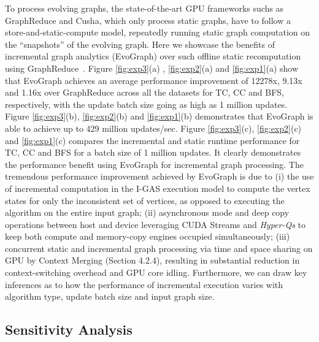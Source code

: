 To process evolving graphs, the state-of-the-art GPU frameworks suchs as GraphReduce and Cusha, which only process static graphs, have to follow a store-and-static-compute model, repeatedly running static graph computation on the “snapshots” of the evolving graph. Here we showcase the benefits of incremental graph analytics (EvoGraph) over such offline static recomputation using GraphReduce~\cite{GraphReduce}. Figure \ref{fig:exp3}(a) , \ref{fig:exp2}(a) and  \ref{fig:exp1}(a) show that  EvoGraph achieves an average performance improvement of 12278x, 9.13x and 1.16x over GraphReduce across all the datasets for TC, CC and BFS, respectively, with the update batch size going as high as 1 million updates. Figure  \ref{fig:exp3}(b), \ref{fig:exp2}(b) and \ref{fig:exp1}(b) demonstrates that EvoGraph is able to achieve up to 429 million updates/sec.  Figure \ref{fig:exp3}(c), \ref{fig:exp2}(c) and  \ref{fig:exp1}(c) compares the incremental and static runtime performance for TC, CC and BFS for a batch size of 1 million updates. It clearly demonstrates the performance benefit using EvoGraph for incremental graph processing. The tremendous performance improvement achieved by EvoGraph is due to (i) the use of incremental computation in the I-GAS execution model to compute the vertex states for only the inconsistent set of vertices, as opposed to executing the algorithm on the entire input graph; (ii) asynchronous mode and deep copy operations between host and device leveraging CUDA Streams and \textit{Hyper-Qs} to keep both compute and memory-copy engines occupied simultaneously; (iii) concurrent static and incremental graph processing via time and space sharing on GPU by Context Merging (Section 4.2.4), resulting in substantial reduction in context-switching overhead and GPU core idling. Furthermore, we can draw key inferences as to how the performance of incremental execution varies with algorithm type, update batch size and input graph size. 



\subsection{Sensitivity Analysis}

